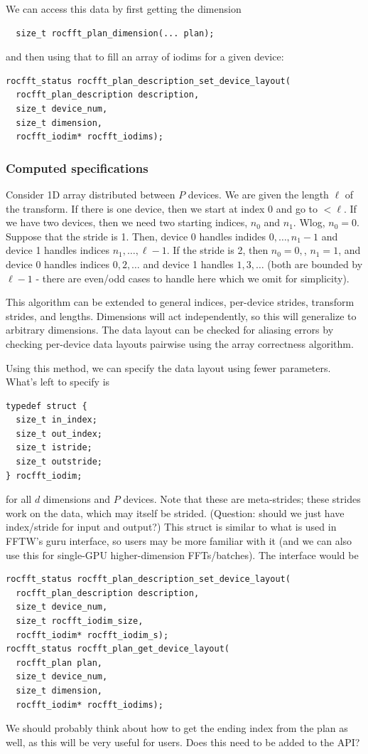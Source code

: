 \documentclass[12pt]{article}
\renewcommand{\(}{\left(}
\renewcommand{\)}{\right)}
\begin{document}
We can access this data by first getting the dimension
\begin{lstlisting}
  size_t rocfft_plan_dimension(... plan);
\end{lstlisting}
and then using that to fill an array of iodims for a given device:
\begin{lstlisting}
rocfft_status rocfft_plan_description_set_device_layout(
  rocfft_plan_description description,
  size_t device_num,
  size_t dimension,
  rocfft_iodim* rocfft_iodims);
\end{lstlisting}

\subsubsection{Computed specifications}

Consider 1D array distributed between $P$ devices.  We are given the
length $\ell$ of the transform.  If there is one device, then we start
at index $0$ and go to $<\ell$.  If we have two devices, then we need
two starting indices, $n_0$ and $n_1$.  Wlog, $n_0=0$.  Suppose that
the stride is 1.  Then, device 0 handles indides $0,\dots,n_1-1$ and
device 1 handles indices $n_1,\dots,\ell-1$.  If the stride is 2, then
$n_0=0,$, $n_1=1$, and device 0 handles indices $0,2,\dots$ and device
1 handles $1, 3, \dots$ (both are bounded by $\ell-1$ - there are
even/odd cases to handle here which we omit for simplicity).

This algorithm can be extended to general indices, per-device strides,
transform strides, and lengths.  Dimensions will act independently, so
this will generalize to arbitrary dimensions.  The data layout can be
checked for aliasing errors by checking per-device data layouts
pairwise using the array correctness algorithm.

Using this method, we can specify the data layout using fewer
parameters.  What's left to specify is
\begin{lstlisting}
typedef struct {
  size_t in_index;
  size_t out_index;
  size_t istride;
  size_t outstride;
} rocfft_iodim;
\end{lstlisting}
for all $d$ dimensions and $P$ devices.  Note that these are
meta-strides; these strides work on the data, which may itself be
strided.  (Question: should we just have index/stride for input and
output?)  This struct is similar to what is used in FFTW's guru
interface, so users may be more familiar with it (and we can also use
this for single-GPU higher-dimension FFTs/batches).  The interface
would be
\begin{lstlisting}
rocfft_status rocfft_plan_description_set_device_layout(
  rocfft_plan_description description,
  size_t device_num,
  size_t rocfft_iodim_size,
  rocfft_iodim* rocfft_iodim_s);
rocfft_status rocfft_plan_get_device_layout(
  rocfft_plan plan,
  size_t device_num,
  size_t dimension,
  rocfft_iodim* rocfft_iodims);
\end{lstlisting}
We should probably think about how to get the ending index from the
plan as well, as this will be very useful for users.  Does this need to
be added to the API?
\end{document}
